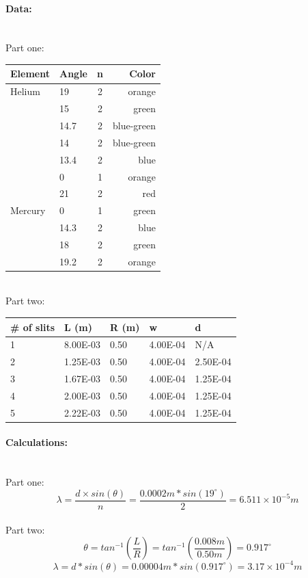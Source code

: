 \documentclass[12pt]{article}
\begin{document}
\paragraph{Data:} \mbox{} \\
Part one:
\begin{tabular}{| l | l | c | r |}
	\hline
	Element & Angle & n & Color \\ \hline
	Helium & 19 & 2 & orange \\
	& 15 & 2 & green \\
	& 14.7 & 2 & blue-green \\
	& 14 & 2 & blue-green \\
	& 13.4 & 2 & blue \\
	& 0 & 1 & orange \\
	& 21 & 2 & red \\ \hline
	Mercury & 0 & 1 & green \\
	& 14.3 & 2 & blue \\
	& 18 & 2 & green \\
	& 19.2 & 2 & orange \\ \hline
\end{tabular}
\mbox{} \\
Part two:
\begin{tabular}{| l | l | l | l | l |}
	\hline
	\# of slits & L (m) & R (m) & w & d \\ \hline
	1 & 8.00E-03 & 0.50 & 4.00E-04 & N/A \\
	2 & 1.25E-03 & 0.50 & 4.00E-04 & 2.50E-04 \\
	3 & 1.67E-03 & 0.50 & 4.00E-04 & 1.25E-04 \\
	4 & 2.00E-03 & 0.50 & 4.00E-04 & 1.25E-04 \\
	5 & 2.22E-03 & 0.50 & 4.00E-04 & 1.25E-04 \\ \hline
\end{tabular}


\paragraph{Calculations:} \mbox{} \\
Part one:
\begin{equation*}
\lambda = \frac{d \times sin(\theta)}{n} = \frac{0.0002m * sin(19^\circ)}{2} = 6.511 \times 10^{-5} m
\end{equation*}
\mbox{} \\
Part two:
\begin{equation*}
\theta = tan^{-1} (\frac{L}{R}) = tan^{-1} (\frac{0.008m}{0.50m}) = 0.917^{\circ}
\end{equation*}
\begin{equation*}
\lambda = d*sin(\theta) = 0.00004m * sin(0.917^\circ) = 3.17 \times 10^{-4}m
\end{equation*}
\end{document}

